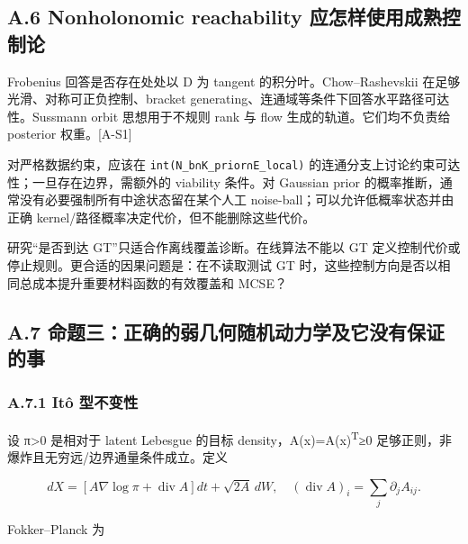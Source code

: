\documentclass[
  11pt,
  a4paper,
]{article}
\begin{document}
\hypertarget{a.6-nonholonomic-reachability-ux5e94ux600eux6837ux4f7fux7528ux6210ux719fux63a7ux5236ux8bba}{%
\subsection{A.6 Nonholonomic reachability
应怎样使用成熟控制论}\label{a.6-nonholonomic-reachability-ux5e94ux600eux6837ux4f7fux7528ux6210ux719fux63a7ux5236ux8bba}}

Frobenius 回答是否存在处处以 D 为 tangent 的积分叶。Chow--Rashevskii
在足够光滑、对称可正负控制、bracket
generating、连通域等条件下回答水平路径可达性。Sussmann orbit
思想用于不规则 rank 与 flow 生成的轨道。它们均不负责给 posterior
权重。{[}A-S1{]}

对严格数据约束，应该在 \texttt{int(N\_\allowbreak{}b∩K\_\allowbreak{}prior∩E\_\allowbreak{}local)}
的连通分支上讨论约束可达性；一旦存在边界，需额外的 viability 条件。对
Gaussian prior 的概率推断，通常没有必要强制所有中途状态留在某个人工
noise-ball；可以允许低概率状态并由正确
kernel/路径概率决定代价，但不能删除这些代价。

研究``是否到达 GT''只适合作离线覆盖诊断。在线算法不能以 GT
定义控制代价或停止规则。更合适的因果问题是：在不读取测试 GT
时，这些控制方向是否以相同总成本提升重要材料函数的有效覆盖和 MCSE？

\hypertarget{a.7-ux547dux9898ux4e09ux6b63ux786eux7684ux5f31ux51e0ux4f55ux968fux673aux52a8ux529bux5b66ux53caux5b83ux6ca1ux6709ux4fddux8bc1ux7684ux4e8b}{%
\subsection{A.7
命题三：正确的弱几何随机动力学及它没有保证的事}\label{a.7-ux547dux9898ux4e09ux6b63ux786eux7684ux5f31ux51e0ux4f55ux968fux673aux52a8ux529bux5b66ux53caux5b83ux6ca1ux6709ux4fddux8bc1ux7684ux4e8b}}

\hypertarget{a.7.1-ituxf4-ux578bux4e0dux53d8ux6027}{%
\subsubsection{A.7.1 Itô
型不变性}\label{a.7.1-ituxf4-ux578bux4e0dux53d8ux6027}}

设 π\textgreater0 是相对于 latent Lebesgue 的目标 density，A(x)=A(x)\textsuperscript{T}≥0
足够正则，非爆炸且无穷远/边界通量条件成立。定义

\[
dX=[A\nabla\log\pi+\operatorname{div}A]dt+\sqrt{2A}\,dW,
\quad(\operatorname{div}A)_i=\sum_j\partial_jA_{ij}.
\]

Fokker--Planck 为
\end{document}
